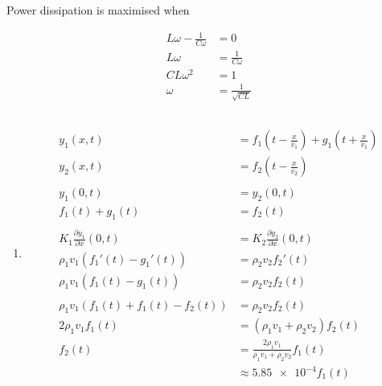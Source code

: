 \documentclass{article}
\begin{document}
Power dissipation is maximised when

\begin{align*}
  L \omega - \frac{1}{C \omega} & = 0                    \\
  L \omega                      & = \frac{1}{C \omega}   \\
  C L \omega^2                  & = 1                    \\
  \omega                        & = \frac{1}{\sqrt{C L}}
\end{align*}

\subsection{}

\begin{enumerate}
  \item

        \begin{align*}
          y_1(x, t)                                 & = f_1 \left( t - \frac{x}{v_1} \right) + g_1 \left( t + \frac{x}{v_1} \right) \\
          y_2(x, t)                                 & = f_2 \left( t - \frac{x}{v_2} \right)                                        \\ \\
          y_1(0, t)                                 & = y_2(0, t)                                                                   \\
          f_1(t) + g_1(t)                           & = f_2(t)                                                                      \\ \\
          K_1 \frac{\partial y_1}{\partial x}(0, t) & = K_2 \frac{\partial y_2}{\partial x}(0, t)                                   \\
          \rho_1 v_1 (f_1'(t) - g_1'(t))            & = \rho_2 v_2 f_2'(t)                                                          \\
          \rho_1 v_1 (f_1(t) - g_1(t))              & = \rho_2 v_2 f_2(t)                                                           \\ \\
          \rho_1 v_1 (f_1(t) + f_1(t) - f_2(t))     & = \rho_2 v_2 f_2(t)                                                           \\
          2 \rho_1 v_1 f_1(t)                       & = (\rho_1 v_1 + \rho_2 v_2) f_2(t)                                            \\
          f_2(t)                                    & = \frac{2 \rho_1 v_1}{\rho_1 v_1 + \rho_2 v_2} f_1(t)                         \\
                                                    & \approx \num{5.85e-4} f_1(t)
        \end{align*}


\end{enumerate}
\end{document}

